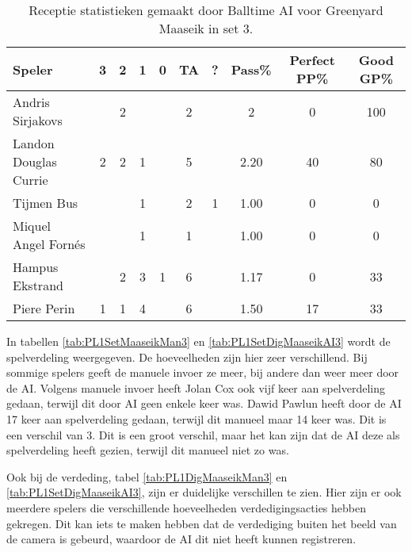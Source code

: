 \begin{table}[ht!]
  \centering
  \scriptsize
  \begin{tabular}{|l|c|c|c|c|c|c|c|c|c|} \hline
    \textbf{Speler} & 3 & 2 & 1 & 0 & TA & ? & Pass\% & Perfect PP\% & Good GP\% \\ \hline
    Andris Sirjakovs &  & 2 &  &  & 2 &  & 2 & 0 & 100 \\
    Landon Douglas Currie & 2 & 2 & 1 &  & 5 &  & 2.20 & 40 & 80 \\
    Tijmen Bus &  &  & 1 &  & 2 & 1 & 1.00 & 0 & 0 \\
    Miquel Angel Fornés &   &  & 1 &  & 1 &  & 1.00 & 0 & 0 \\
    Hampus Ekstrand &  & 2 & 3 & 1 & 6 &  & 1.17 & 0 & 33 \\
    Piere Perin & 1 & 1 & 4 &  & 6 &  & 1.50 & 17 & 33 \\ \hline
  \end{tabular}
  \caption[Receptiestatistieken gemaakt door Balltime AI voor Greenyard Maaseik in set 3]{\label{tab:PL1ReceiveMaaseikAI3}Receptie statistieken gemaakt door Balltime AI voor Greenyard Maaseik in set 3.}
\end{table}

In tabellen \ref{tab:PL1SetMaaseikMan3} en \ref{tab:PL1SetDigMaaseikAI3} wordt de spelverdeling weergegeven. De hoeveelheden zijn hier zeer verschillend. Bij sommige spelers geeft de manuele invoer ze meer, bij andere dan weer meer door de AI. Volgens manuele invoer heeft Jolan Cox ook vijf keer aan spelverdeling gedaan, terwijl dit door AI geen enkele keer was. Dawid Pawlun heeft door de AI 17 keer aan spelverdeling gedaan, terwijl dit manueel maar 14 keer was. Dit is een verschil van 3. Dit is een groot verschil, maar het kan zijn dat de AI deze als spelverdeling heeft gezien, terwijl dit manueel niet zo was.

Ook bij de verdeding, tabel \ref{tab:PL1DigMaaseikMan3} en \ref{tab:PL1SetDigMaaseikAI3}, zijn er duidelijke verschillen te zien. Hier zijn er ook meerdere spelers die verschillende hoeveelheden verdedigingsacties hebben gekregen. Dit kan iets te maken hebben dat de verdediging buiten het beeld van de camera is gebeurd, waardoor de AI dit niet heeft kunnen registreren.

